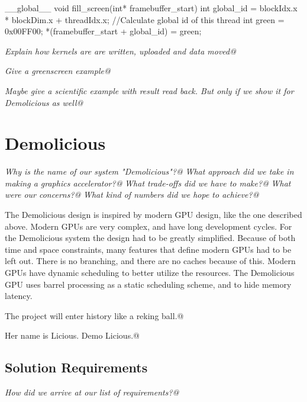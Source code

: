 \documentclass[../main/report.tex]{subfiles}
\begin{document}
\begin{c-code}[caption=A sequential program filling the screen with green@, label=sequential-green]
__global__ void fill_screen(int* framebuffer_start){
	int global_id = blockIdx.x * blockDim.x + threadIdx.x; //Calculate global id of this thread
	int green     = 0x00FF00;
	*(framebuffer_start + global_id) = green;
}
\end{c-code}





\emph{Explain how kernels are are written, uploaded and data moved@}

\emph{Give a greenscreen example@}

\emph{Maybe give a scientific example with result read back. But only if we show it for Demolicious as well@}


\section{Demolicious}

\textit{Why is the name of our system "Demolicious"?@}
\textit{What approach did we take in making a graphics accelerator?@}
\textit{What trade-offs did we have to make?@}
\textit{What were our concerns?@}
\textit{What kind of numbers did we hope to achieve?@}

The Demolicious design is inspired by modern GPU design, like the one described above.
Modern GPUs are very complex, and have long development cycles.
For the Demolicious system the design had to be greatly simplified.
Because of both time and space constraints, many features that define modern GPUs had to be left out.
There is no branching, and there are no caches because of this.
Modern GPUs have dynamic scheduling to better utilize the resources.
The Demolicious GPU uses barrel processing as a static scheduling scheme, and to hide memory latency.


The project will enter history like a reking ball.@

Her name is Licious. Demo Licious.@

\subsection{Solution Requirements}

\textit{How did we arrive at our list of requirements?@}
\end{document}
